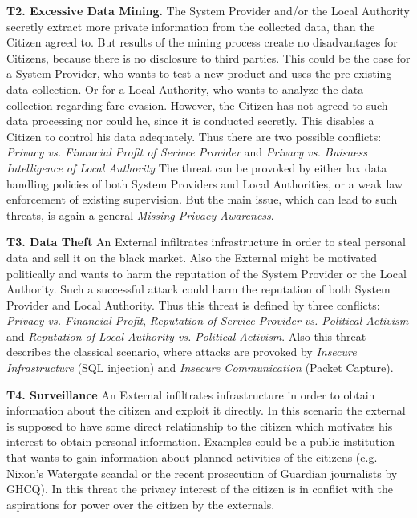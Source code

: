 \documentclass[runningheads,a4paper]{llncs}
\begin{document}
\textbf{T2. Excessive Data Mining.}
The System Provider and/or the Local Authority secretly extract more private information from the collected data, than the Citizen agreed to.
But results of the mining process create no disadvantages for Citizens, because there is no disclosure to third parties.
This could be the case for a System Provider, who wants to test a new product and uses the pre-existing data collection.
Or for a Local Authority, who wants to analyze the data collection regarding fare evasion.
However, the Citizen has not agreed to such data processing nor could he, since it is conducted secretly.
This disables a Citizen to control his data adequately.
Thus there are two possible conflicts: \textit{Privacy vs. Financial Profit of Serivce Provider} and  \textit{Privacy vs. Buisness Intelligence of Local Authority}
The threat can be provoked by either lax data handling policies of both System Providers and Local Authorities, or a weak law enforcement of existing supervision.
But the main issue, which can lead to such threats, is again a general \textit{Missing Privacy Awareness}.

\textbf{T3. Data Theft}
An External infiltrates infrastructure in order to steal personal data and sell it on the black market. Also the External might be motivated politically and wants to harm the reputation of the System Provider or the Local Authority. Such a successful attack could harm the reputation of both System Provider and Local Authority. Thus this threat is defined by three conflicts: \textit{Privacy vs. Financial Profit}, \textit{Reputation of Service Provider vs. Political Activism} and \textit{Reputation of Local Authority vs. Political Activism}.
Also this threat describes the classical scenario, where attacks are provoked by \textit{Insecure Infrastructure} (SQL injection) and \textit{Insecure Communication} (Packet Capture).

\textbf{T4. Surveillance}
An External infiltrates infrastructure in order to obtain information
about the citizen and exploit it directly.  In this scenario the
external is supposed to have some direct relationship to the citizen
which motivates his interest to obtain personal information.  Examples
could be a public institution that wants to gain information about
planned activities of the citizens (e.g. Nixon's Watergate scandal or
the recent prosecution of Guardian journalists by GHCQ). 
In this threat the privacy interest of the citizen is in conflict with
the aspirations for power over the citizen by the externals.
\end{document}
